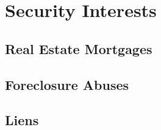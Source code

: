 \chapter{Security Interests}



\section{Real Estate Mortgages}



\begin{questions}

\end{questions}

\section{Foreclosure Abuses}





\begin{questions}

\end{questions}


\section{Liens}



\begin{questions}

\end{questions}



\begin{questions}

\end{questions}



